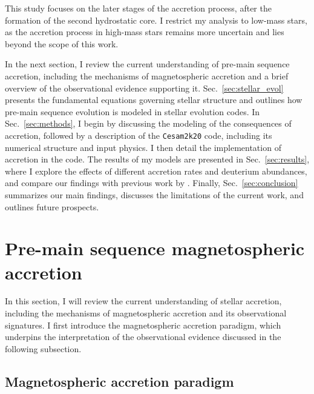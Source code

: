 \documentclass[12pt,a4paper]{article}
\newcommand{\qt}[1]{\textcolor{red}{#1}}
\begin{document}
This study focuses on the later stages of the accretion process, after the formation of the second hydrostatic core. I restrict my analysis to low-mass stars, as the accretion process in high-mass stars remains more uncertain and lies beyond the scope of this work.

In the next section, I review the current understanding of pre-main sequence accretion, including the mechanisms of magnetospheric accretion and a brief overview of the observational evidence supporting it. Sec.~\ref{sec:stellar_evol} presents the fundamental equations governing stellar structure and outlines how pre-main sequence evolution is modeled in stellar evolution codes. In Sec.~\ref{sec:methods}, I begin by discussing the modeling of the consequences of accretion, followed by a description of the \texttt{Cesam2k20} code, including its numerical structure and input physics. I then detail the implementation of accretion in the code. The results of my models are presented in Sec.~\ref{sec:results}, where I explore the effects of different accretion rates and deuterium abundances, and compare our findings with previous work by \textcite{PallaStahler1993}. Finally, Sec.~\ref{sec:conclusion} summarizes our main findings, discusses the limitations of the current work, and outlines future prospects.

\section{Pre-main sequence magnetospheric accretion}
\label{sec:background}

In this section, I will review the current understanding of stellar accretion, including the mechanisms of magnetospheric accretion and its observational signatures. I first introduce the magnetospheric accretion paradigm, which underpins the interpretation of the observational evidence discussed in the following subsection.

\subsection{Magnetospheric accretion paradigm}
\label{sec:magnetospheric_accretion}
\end{document}
